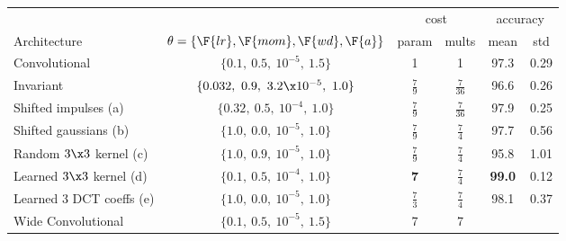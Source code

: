 \begin{table}[hbt]
  \renewcommand{\arraystretch}{1.4}
  \centering
  \label{tab:ch5:mnist_new_results}
  \begin{tabular}{@{}l c c c c c@{}}
    \toprule
    & & \multicolumn{2}{c}{cost} & \multicolumn{2}{c}{accuracy} \\\cline{3-4}\cline{5-6}
    Architecture & $\theta = \{\F{lr}, \F{mom}, \F{wd}, \F{a}\}$ & param & mults & mean & std  \\\midrule
    Convolutional & $\{0.1,\ 0.5,\ 10^{-5},\ 1.5 \}$ & 1 & 1 & 97.3 & 0.29 \\
    Invariant & $\{0.032,\ 0.9,\ 3.2\x 10^{-5},\ 1.0 \}$ & $\frac{7}{9}$ & $\frac{7}{36}$ & 96.6 & 0.26 \\\midrule
    Shifted impulses (a) & $\{0.32,\ 0.5,\ 10^{-4},\ 1.0 \}$ & $\frac{7}{9}$ & $\frac{7}{36}$ & 97.9 & 0.25 \\
    Shifted gaussians (b) & $\{1.0,\ 0.0,\ 10^{-5},\ 1.0 \}$ & $\frac{7}{9}$ & $\frac{7}{4}$ & 97.7 & 0.56\\
    Random $3\x3$ kernel (c) & $\{1.0,\ 0.9,\  10^{-5},\ 1.0 \}$ & $\frac{7}{9}$ & $\frac{7}{4}$ & 95.8 & 1.01\\
    Learned $3\x3$ kernel (d) & $\{0.1,\ 0.5,\  10^{-4},\ 1.0 \}$ & \textbf{7} & $\frac{7}{4}$ & \textbf{99.0} & 0.12 \\
    Learned 3 DCT coeffs (e) & $\{1.0,\ 0.0,\ 10^{-5},\ 1.0 \}$ & $\frac{7}{3}$ & $\frac{7}{4}$ & 98.1 & 0.37\\\midrule
    Wide Convolutional & $\{0.1,\ 0.5,\ 10^{-5},\ 1.5 \}$ & 7 & 7 &  &  \\
    \bottomrule
  \end{tabular}
\end{table}


